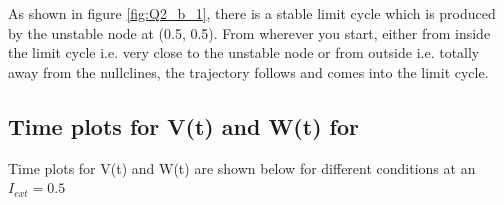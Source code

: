 \documentclass[a4paper, 12pt]{article}
\begin{document}
\vspace{2em}
As shown in figure \ref{fig:Q2_b_1}, there is a stable limit cycle which is produced by the unstable node at (0.5, 0.5). From wherever you start, either from inside the limit cycle i.e. very close to the unstable node or from outside i.e. totally away from the nullclines, the trajectory follows and comes into the limit cycle.

\subsection{Time plots for V(t) and W(t) for  }

Time plots for V(t) and W(t) are shown below for different conditions at an $ I_{ext} = 0.5 $ 

\subsubsection{}
\end{document}

